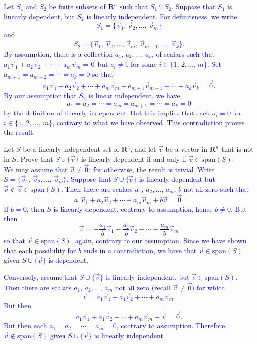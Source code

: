 \documentclass[a4paper,11pt]{article}
\newcommand{\R}{\mathbf{R}}
\newcommand{\BB}[1]{\textcolor{blue}{#1}}
\begin{document}
\BB{Let $S_1$ and $S_2$ be finite subsets of $\R^n$ such that $S_1 \subseteqq
S_2$. Suppose that $S_1$ is linearly dependent, but $S_2$ is linearly
independent. For definiteness, we write
\[
  S_1 = \{\vec v_1,\,\vec v_2,\dots,\,\vec v_m\}
\]
and
\[
  S_2 = \{\vec v_1,\,\vec v_2,\dots,\,\vec v_m,\,\vec v_{m+1},\dots,\,\vec v_k\}.
\] By assumption, there is a collection $a_1,\,a_2,\dots,\,a_m$ of scalars such
that $a_1\vec v_1 + a_2\vec v_2 + \cdots + a_m\vec v_m=\vec 0$ but $a_i \neq 0$
for some $i \in \{1,\,2,\dots,\,m\}$. Set $a_{m+1}=a_{m+2}=\cdots=a_k=0$ so that
\[
  a_1\vec v_1 + a_2\vec v_2 + \cdots + a_m\vec v_m + a_{m+1}\vec v_{m+1} + \cdots
  + a_k\vec v_k = \vec 0.
\]
By our assumption that $S_2$ is linear independent, we have
\[
  a_1=a_2=\cdots=a_m=a_{m+1}=\cdots=a_k=0
\]
by the definition of linearly independent. But this implies that each $a_i=0$ for
$i \in \{1,\,2,\dots,\,m\}$, contrary to what we have observed. This
contradiction proves the result. \\}

 Let $S$ be a linearly independent set of $\R^n$,
and let $\vec v$ be a vector in $\R^n$ that is not in $S$. Prove that $S \cup
\{\vec v\}$ is linearly dependent if and only if $\vec v \in \text{span}(S)$. \\

\BB{We may assume that $\vec v \neq \vec 0$; for otherwise, the result is
trivial. Write $S=\{\vec v_1,\,\vec v_2,\dots,\,\vec v_m\}$. Suppose that $S
\cup \{\vec v\}$ is linearly dependent but $\vec v \notin \vec v \in
\text{span}(S)$. Then there are scalars $a_1,\,a_2,\dots,\,a_m,\,b$ not all zero
such that
  \[
    a_1\vec v_1 + a_2\vec v_2 + \cdots + a_m\vec v_m + b\vec v = \vec 0.
  \]
  If $b=0$, then $S$ is linearly dependent, contrary to assumption, hence $b
  \neq 0$. But then
  \[
    \vec v = -\frac{a_1}{b}\vec v_1 - \frac{a_2}{b}\vec v_2 - \cdots -
    \frac{a_m}{b}\vec v_m
  \]
  so that $\vec v \in \text{span}(S)$, again, contrary to our assumption. Since
  we have shown that each possibility for $b$ ends in a contradiction, we have
  that $\vec v \in \text{span}(S)$ given $S \cup \{\vec v\}$ is dependent.}

\BB{Conversely, assume that $S \cup \{\vec v\}$ is linearly independent, but
  $\vec v \in \text{span}(S)$. Then there are scalars $a_1,\,a_2,\dots,\,a_m$
  not all zero (recall $\vec v \neq \vec 0$) for which
  \[
    \vec v = a_1\vec v_1 + a_1\vec v_2 + \cdots + a_m\vec v_m.
  \]
  But then
  \[
    a_1\vec v_1 + a_1\vec v_2 + \cdots + a_m\vec v_m - \vec v = \vec 0.
  \]
  But then each $a_1=a_2=\cdots=a_m=0$, contrary to assumption. Therefore, $\vec
  v \notin \text{span}(S)$ given $S \cup \{\vec v\}$ is linearly independent. \\}
\end{document}
